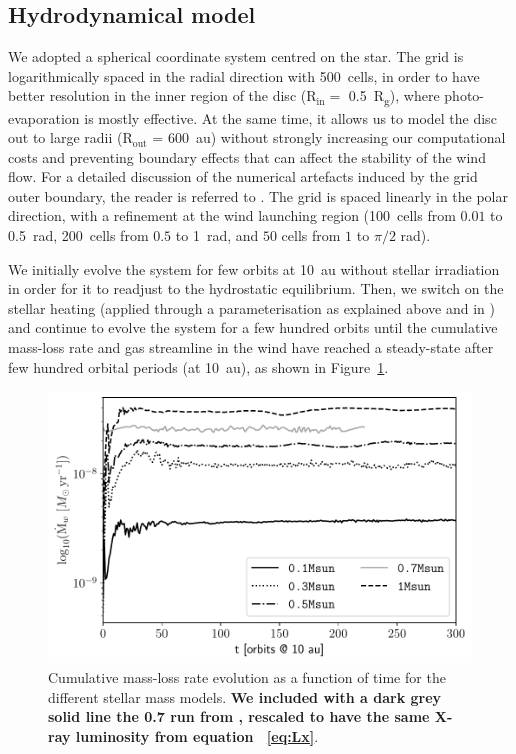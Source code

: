 \documentclass[usenatbib,useAMS,usedcolumn]{mnras}
\begin{document}
\subsection{Hydrodynamical model}\label{sec:hydro-model}

We adopted a spherical coordinate system centred on the star.
The grid is logarithmically spaced in the radial direction with \SI{500}{cells}, in order to have better resolution in the inner region of the disc (R$_\mathrm{in}=$ \SI{0.5}{R_g}), where photo-evaporation is mostly effective.
At the same time, it allows us to model the disc out to large radii (R$_\mathrm{out}$ = \SI{600}{\astronomicalunit}) without strongly increasing our computational costs and preventing boundary effects that can affect the stability of the wind flow.
For a detailed discussion of the numerical artefacts induced by the grid outer boundary, the reader is referred to .
The grid is spaced linearly in the polar direction, with a refinement at the wind launching region (\SI{100}{cells} from $0.01$ to \SI{0.5}{rad}, \SI{200}{cells} from $0.5$ to \SI{1}{rad}, and $50$ cells from $1$ to $\pi / 2$ rad).

We initially evolve the system for few orbits at \SI{10}{au} without stellar irradiation in order for it to readjust to the hydrostatic equilibrium. Then, we switch on the stellar heating (applied through a parameterisation as explained above and in ) and continue to evolve the system for a few hundred orbits until the cumulative mass-loss rate and gas streamline in the wind have reached a steady-state after few hundred orbital periods (at \SI{10}{au}), as shown in Figure~\ref{fig:mdotevol}.
\begin{figure}
    \centering
    \includegraphics[width=\columnwidth]{Figure3}
    \caption{Cumulative mass-loss rate evolution as a function of time for the different stellar mass models. \textbf{We included with a dark grey solid line the \SI{0.7}{\solarmass} run from , rescaled to have the same X-ray luminosity from equation~
    \ref{eq:Lx}}. \label{fig:mdotevol}}
\end{figure}
\end{document}
